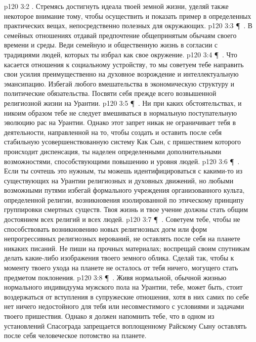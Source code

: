 \vs p120 3:2 . Стремясь достигнуть идеала твоей земной жизни, уделяй также некоторое внимание тому, чтобы осуществить и показать пример в определенных практических вещах, непосредственно полезных для окружающих.
\vs p120 3:3 \P\ . В семейных отношениях отдавай предпочтение общепринятым обычаям своего времени и среды. Веди семейную и общественную жизнь в согласии с традициями людей, которых ты избрал как свое окружение.
\vs p120 3:4 \P\ . Что касается отношения к социальному устройству, то мы советуем тебе направить свои усилия преимущественно на духовное возрождение и интеллектуальную эмансипацию. Избегай любого вмешательства в экономическую структуру и политические обязательства. Посвяти себя прежде всего возвышенной религиозной жизни на Урантии.
\vs p120 3:5 \P\ . Ни при каких обстоятельствах, и никоим образом тебе не следует вмешиваться в нормальную поступательную эволюцию рас на Урантии. Однако этот запрет никак не ограничивает тебя в деятельности, направленной на то, чтобы создать и оставить после себя стабильную усовершенствованную систему  Как Сын, с пришествием которого происходит диспенсация, ты наделен определенными дополнительными возможностями, способствующими повышению  и  уровня людей.
\vs p120 3:6 \P\ . Если ты сочтешь это нужным, ты можешь идентифицироваться с какими\hyp{}то из существующих на Урантии религиозных и духовных движений, но любыми возможными путями избегай формального учреждения организованного культа, определенной религии, возникновения изолированной по этическому принципу группировки смертных существ. Твоя жизнь и твое учение должны стать общим достоянием всех религий и всех людей.
\vs p120 3:7 \P\ . Советуем тебе, чтобы не способствовать возникновению новых религиозных догм или форм непрогрессивных религиозных верований, не оставлять после себя на планете никаких писаний. Не пиши на прочных материалах; воспрещай своим спутникам делать какие\hyp{}либо изображения твоего земного облика. Сделай так, чтобы к моменту твоего ухода на планете не осталось от тебя ничего, могущего стать предметом поклонения.
\vs p120 3:8 \P\ . Живя нормальной, обычной жизнью нормального индивидуума мужского пола на Урантии, тебе, может быть, стоит воздержаться от вступления в супружеские отношения, хотя в них самих по себе нет ничего недостойного для тебя или несовместимого с условиями и задачами твоего пришествия. Однако я должен напомнить тебе, что в одном из установлений Спасограда запрещается воплощенному Райскому Сыну оставлять после себя человеческое потомство на планете.
